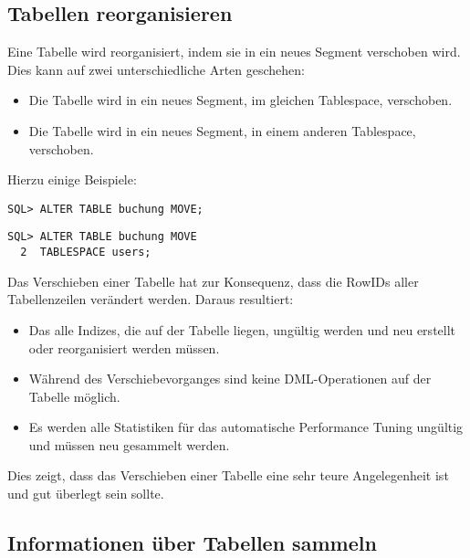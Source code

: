       \subsection{Tabellen reorganisieren}
        Eine Tabelle wird reorganisiert, indem sie in ein neues Segment verschoben wird. Dies kann auf zwei unterschiedliche Arten geschehen:
        \begin{itemize}
          \item Die Tabelle wird in ein neues Segment, im gleichen Tablespace, verschoben.
          \item Die Tabelle wird in ein neues Segment, in einem anderen Tablespace, verschoben.
        \end{itemize}
        Hierzu einige Beispiele:
        \begin{lstlisting}[caption={Reorganisieren der Tabelle \identifier{Buchung}},label=admin310,language=oracle_sql]
SQL> ALTER TABLE buchung MOVE;
        \end{lstlisting}
        \begin{lstlisting}[caption={Verschieben einer Tabelle in einen anderen Tablespace},label=admin311,language=oracle_sql]
SQL> ALTER TABLE buchung MOVE
  2  TABLESPACE users;
        \end{lstlisting}
        Das Verschieben einer Tabelle hat zur Konsequenz, dass die RowIDs aller Tabellenzeilen ver\"andert werden. Daraus resultiert:
        \begin{itemize}
          \item Das alle Indizes, die auf der Tabelle liegen, ung\"ultig werden und neu erstellt oder reorganisiert werden m\"ussen.
          \item W\"ahrend des Verschiebevorganges sind keine DML-Operationen auf der Tabelle m\"og\-lich.
          \item Es werden alle Statistiken f\"ur das automatische Performance Tuning ung\"ultig und m\"ussen neu gesammelt werden.
        \end{itemize}
        Dies zeigt, dass das Verschieben einer Tabelle eine sehr teure Angelegenheit ist und gut \"uberlegt sein sollte.
      \subsection{Informationen \"uber Tabellen sammeln}
        \begin{literaturinternet}
          \item \cite{ADMIN015}
        \end{literaturinternet}
